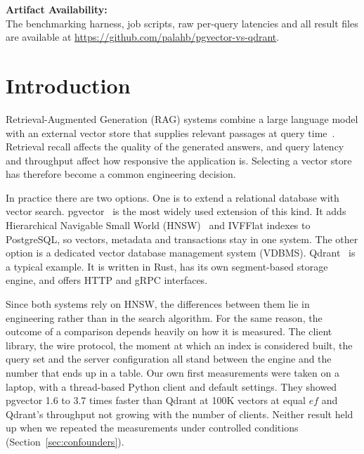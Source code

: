 \documentclass[sigconf, nonacm]{acmart}
\begin{document}

\maketitle

\begingroup\small\noindent\raggedright\textbf{Artifact Availability:}\\
The benchmarking harness, job scripts, raw per-query latencies and all result files
are available at \url{https://github.com/palahb/pgvector-vs-qdrant}.
\endgroup

\section{Introduction}

Retrieval-Augmented Generation (RAG) systems combine a large language model with an
external vector store that supplies relevant passages at query time~\cite{pan2024survey}.
Retrieval recall affects the quality of the generated answers, and query latency and
throughput affect how responsive the application is. Selecting a vector store has
therefore become a common engineering decision.

In practice there are two options. One is to extend a relational database with vector
search. pgvector~\cite{pgvector} is the most widely used extension of this kind. It
adds Hierarchical Navigable Small World (HNSW)~\cite{malkov2018} and IVFFlat indexes to
PostgreSQL, so vectors, metadata and transactions stay in one system. The other option
is a dedicated vector database management system (VDBMS). Qdrant~\cite{qdrant} is a
typical example. It is written in Rust, has its own segment-based storage engine, and
offers HTTP and gRPC interfaces.

Since both systems rely on HNSW, the differences between them lie in engineering
rather than in the search algorithm. For the same reason, the outcome of a comparison
depends heavily on how it is measured. The client library, the wire protocol, the
moment at which an index is considered built, the query set and the server
configuration all stand between the engine and the number that ends up in a table. Our
own first measurements were taken on a laptop, with a thread-based Python client and
default settings. They showed pgvector 1.6 to 3.7 times faster than Qdrant at 100K vectors
at equal $ef$ and Qdrant's throughput not growing with the number of clients. Neither result held up
when we repeated the measurements under controlled conditions
(Section~\ref{sec:confounders}).
\end{document}
